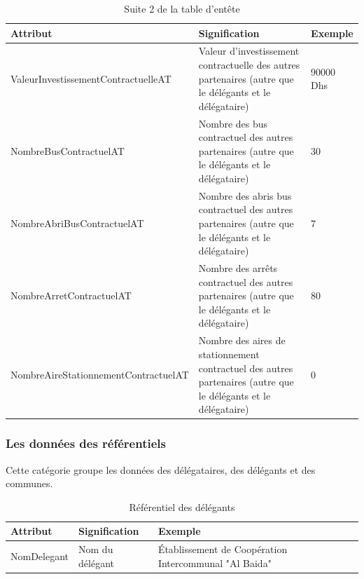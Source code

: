 \documentclass[a4paper]{report}
\begin{document}
\begin{doublespace}
\begin{table}[H]
	\end{table}
	\begin{table}[H]
		\begin{center}
			\begin{tabularx}{17.5cm}{|p{6cm}|X|p{1.6cm}|}
				\hline
				\textbf{Attribut}                    & \textbf{Signification}                                                                                          & \textbf{Exemple} \\
				\hline
				ValeurInvestissementContractuelleAT  & Valeur d'investissement contractuelle des autres partenaires (autre que le délégants et le délégataire)         & 90000 Dhs        \\
				\hline
				NombreBusContractuelAT               & Nombre des bus contractuel des autres partenaires (autre que le délégants et le délégataire)                    & 30               \\
				\hline
				NombreAbriBusContractuelAT           & Nombre des abris bus contractuel des autres partenaires (autre que le délégants et le délégataire)              & 7                \\
				\hline
				NombreArretContractuelAT             & Nombre des arrêts contractuel des autres partenaires (autre que le délégants et le délégataire)                 & 80               \\
				\hline
				NombreAireStationnementContractuelAT & Nombre des aires de stationnement contractuel des autres partenaires (autre que le délégants et le délégataire) & 0                \\
				\hline
			\end{tabularx}
			\caption{Suite 2 de la table d'entête}
		\end{center}
	\end{table}

	\subsubsection{Les données des référentiels}

	Cette catégorie groupe les données des délégataires, des délégants et des communes.

	\begin{table}[H]
		\begin{center}
			\begin{tabularx}{17.5cm}{|p{3cm}|p{3cm}|X|}
				\hline
				\textbf{Attribut} & \textbf{Signification} & \textbf{Exemple}                                       \\
				\hline
				NomDelegant       & Nom du délégant        & Établissement de Coopération Intercommunal  "Al Baida" \\
				\hline
			\end{tabularx}
			\caption{Référentiel des délégants}
		\end{center}
	\end{table}


\end{doublespace}
\end{document}
